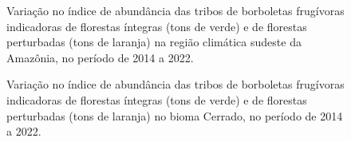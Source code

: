 \documentclass[
  letterpaper,
]{scrbook}
\begin{document}
\begin{figure}[H]


\caption{\label{fig-IA-areas-abertas-regiao-climatica-sudeste-amazonica}Variação
no índice de abundância das tribos de borboletas frugívoras indicadoras
de florestas íntegras (tons de verde) e de florestas perturbadas (tons
de laranja) na região climática sudeste da Amazônia, no período de 2014
a 2022.}

\end{figure}%

\begin{figure}[H]


\caption{\label{fig-IA-cerrado}Variação no índice de abundância das
tribos de borboletas frugívoras indicadoras de florestas íntegras (tons
de verde) e de florestas perturbadas (tons de laranja) no bioma Cerrado,
no período de 2014 a 2022.}

\end{figure}%
\end{document}
